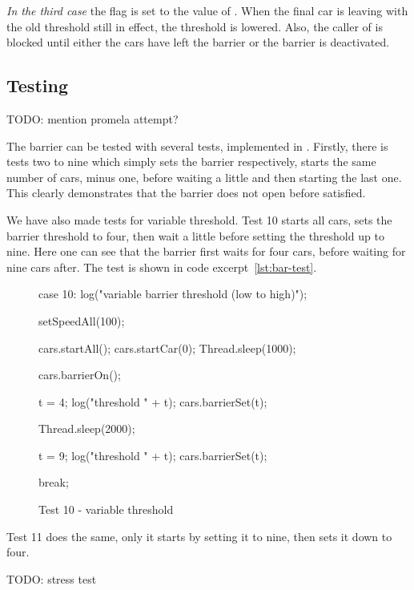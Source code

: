 \emph{In the third case} the flag  is set to
the value of . When the final car is leaving with the old
threshold still in effect, the threshold is lowered. Also, the caller
of  is blocked until either the cars have left the
barrier or the barrier is deactivated.


\subsection{Testing}
\label{sub:bar-test}
TODO: mention promela attempt?

The barrier can be tested with several tests, implemented in
. Firstly, there is tests two to nine which simply
sets the barrier respectively, starts the same number of cars, minus
one, before waiting a little and then starting the last one. This
clearly demonstrates that the barrier does not open before satisfied.

We have also made tests for variable threshold. Test 10 starts all
cars, sets the barrier threshold to four, then wait a little before
setting the threshold up to nine. Here one can see that the barrier first
waits for four cars, before waiting for nine cars after. The test is
shown in code excerpt~\ref{lst:bar-test}.

\begin{figure}[H]
\begin{java}
case 10:
    log("variable barrier threshold (low to high)");

    setSpeedAll(100);

    cars.startAll();
    cars.startCar(0);
    Thread.sleep(1000);

    cars.barrierOn();

    t = 4;
    log("threshold " + t);
    cars.barrierSet(t);

    Thread.sleep(2000);

    t = 9;
    log("threshold " + t);
    cars.barrierSet(t);

    break;
\end{java}
\caption{Test 10 - variable threshold}
\end{figure}

Test 11 does the same, only it starts by setting it to nine, then sets
it down to four.

TODO: stress test
